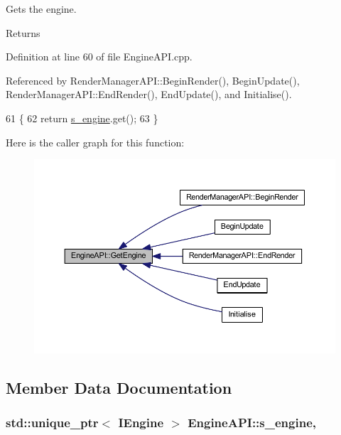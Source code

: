 Gets the engine. 

\begin{DoxyReturn}{Returns}

\end{DoxyReturn}


Definition at line 60 of file Engine\+A\+P\+I.\+cpp.



Referenced by Render\+Manager\+A\+P\+I\+::\+Begin\+Render(), Begin\+Update(), Render\+Manager\+A\+P\+I\+::\+End\+Render(), End\+Update(), and Initialise().


\begin{DoxyCode}
61 \{
62   \textcolor{keywordflow}{return} \hyperlink{class_engine_a_p_i_a9b7a56d6e514ca164517a1a6f3a67a7c}{s\_engine}.get();
63 \}
\end{DoxyCode}


Here is the caller graph for this function\+:
\nopagebreak
\begin{figure}[H]
\begin{center}
\leavevmode
\includegraphics[width=350pt]{class_engine_a_p_i_a6cecc94147f6fed1c2f886c082051bc7_icgraph}
\end{center}
\end{figure}




\subsection{Member Data Documentation}
\subsubsection[{\texorpdfstring{s\+\_\+engine}{s_engine}}]{\setlength{\rightskip}{0pt plus 5cm}std\+::unique\+\_\+ptr$<$ {\bf I\+Engine} $>$ Engine\+A\+P\+I\+::s\+\_\+engine\hspace{0.3cm}{\ttfamily [static]}, {\ttfamily [private]}}\hypertarget{class_engine_a_p_i_a9b7a56d6e514ca164517a1a6f3a67a7c}{}\label{class_engine_a_p_i_a9b7a56d6e514ca164517a1a6f3a67a7c}



